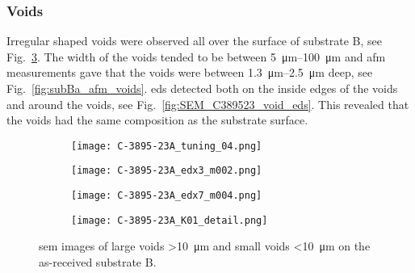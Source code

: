 \subsubsection{Voids}
Irregular shaped voids were observed all over the surface of substrate B, see Fig.~\ref{fig:SEM_C389523_voids}. The width of the voids tended to be between \SIrange{5}{100}{\micro\metre} and \ac{afm} measurements gave that the voids were between \SIrange{1.3}{2.5}{\micro\metre} deep, see Fig.~\ref{fig:subBa_afm_voids}. \Ac{eds} detected  both on the inside edges of the voids and around the voids, see Fig.~\ref{fig:SEM_C389523_void_eds}. This revealed that the voids had the same composition as the substrate surface.

\begin{figure}[htbp]
    \centering
    \begin{subfigure}[t]{\textwidth}
    \caption{}\label{fig:subBa_voids}
          \begin{minipage}[c]{0.49\linewidth}
            \centering
            \texttt{[image: C-3895-23A\_tuning\_04.png]}
          \end{minipage}
          \hfill
          \begin{minipage}[c]{0.49\linewidth}
            \centering
            \texttt{[image: C-3895-23A\_edx3\_m002.png]}
          \end{minipage}
    \end{subfigure}%
    \par\bigskip
    \begin{subfigure}[t]{\textwidth}
    \caption{}\label{fig:subBa_microvoids}
          \begin{minipage}[c]{0.49\linewidth}
            \centering
            \texttt{[image: C-3895-23A\_edx7\_m004.png]}
          \end{minipage}
          \hfill
          \begin{minipage}[c]{0.49\linewidth}
            \centering
            \texttt{[image: C-3895-23A\_K01\_detail.png]}
          \end{minipage}
    \end{subfigure}%
    \caption[\Ac{sem} images of voids on substrate B.]{\Ac{sem} images of  large voids \SI{>10}{\micro\metre} and  small voids \SI{<10}{\micro\metre} on the as-received substrate B.}
    \label{fig:SEM_C389523_voids}
\end{figure}

